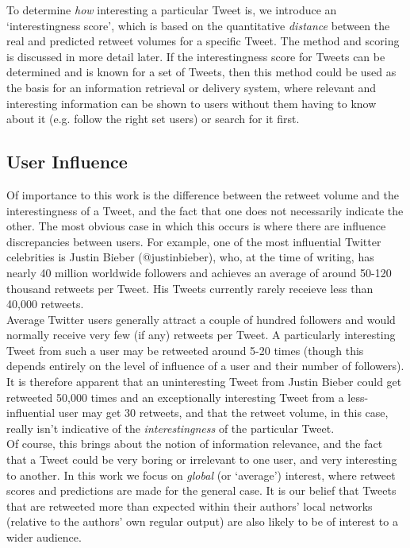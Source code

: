 To determine \textit{how} interesting a particular Tweet is, we introduce an `interestingness score', which is based on the quantitative \textit{distance} between the real and predicted retweet volumes for a specific Tweet. The method and scoring is discussed in more detail later. If the interestingness score for Tweets can be determined and is known for a set of Tweets, then this method could be used as the basis for an information retrieval or delivery system, where relevant and interesting information can be shown to users without them having to know about it (e.g. follow the right set users) or search for it first.

\subsection{User Influence}
Of importance to this work is the difference between the retweet volume and the interestingness of a Tweet, and the fact that one does not necessarily indicate the other. The most obvious case in which this occurs is where there are influence discrepancies between users. For example, one of the most influential Twitter celebrities is Justin Bieber (@justinbieber), who, at the time of writing, has nearly 40 million worldwide followers and achieves an average of around 50-120 thousand retweets per Tweet. His Tweets currently rarely receieve less than 40,000 retweets. \\
Average Twitter users generally attract a couple of hundred followers and would normally receive very few (if any) retweets per Tweet. A particularly interesting Tweet from such a user may be retweeted around 5-20 times (though this depends entirely on the level of influence of a user and their number of followers).\\
It is therefore apparent that an uninteresting Tweet from Justin Bieber could get retweeted 50,000 times and an exceptionally interesting Tweet from a less-influential user may get 30 retweets, and that the retweet volume, in this case, really isn't indicative of the \textit{interestingness} of the particular Tweet.\\
Of course, this brings about the notion of information relevance, and the fact that a Tweet could be very boring or irrelevant to one user, and very interesting to another. In this work we focus on \textit{global} (or `average') interest, where retweet scores and predictions are made for the general case. It is our belief that Tweets that are retweeted more than expected within their authors' local networks (relative to the authors' own regular output) are also likely to be of interest to a wider audience.


